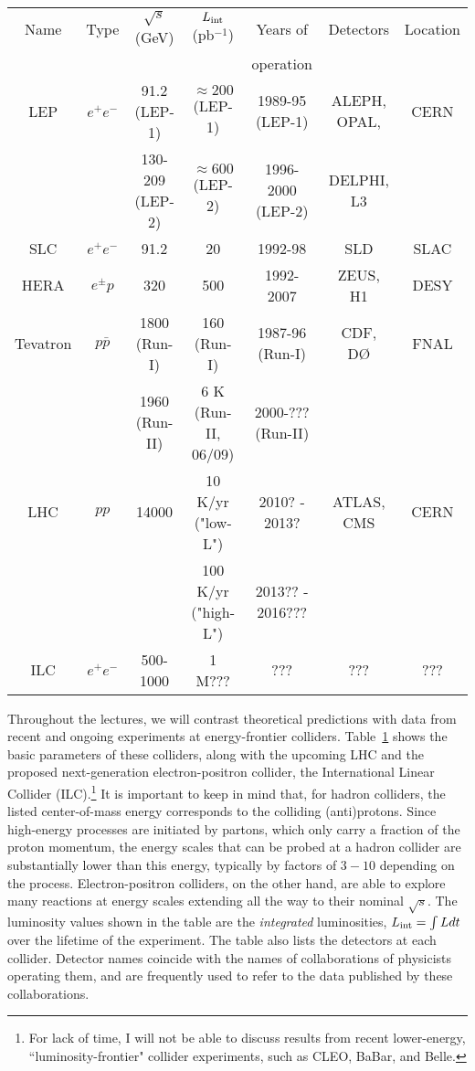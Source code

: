\documentclass{ws-procs9x6}
\begin{document}
\renewcommand{\arraystretch}{1.4}
\begin{table}
{\begin{tabular}{|c|c|c|c|c|c|c|} \hline
  Name & Type & $\sqrt{s}$ (GeV) & $L_{\rm int}$ (pb$^{-1}$) & 
Years of & Detectors  & Location \\
 & & & & operation & & \\ \hline \hline
 LEP & $e^+e^-$ & 91.2 (LEP-1) & $\approx 200$ (LEP-1) & 1989-95 (LEP-1) & ALEPH, OPAL, & CERN \\
      &  & 130-209 (LEP-2) & $\approx 600$ (LEP-2) & 1996-2000 (LEP-2) & DELPHI, L3 & \\
 SLC & $e^+e^-$ & 91.2 & 20 & 1992-98 & SLD & SLAC \\
 HERA & $e^\pm p$ & 320 & 500 & 1992-2007 & ZEUS, H1 & DESY \\
Tevatron & $p\bar{p}$ & 1800 (Run-I) & 160 (Run-I) & 1987-96 (Run-I) & CDF, D{\O} & FNAL \\
& & 1960 (Run-II) & 6 K (Run-II, 06/09) & 2000-??? (Run-II) & & \\
LHC & $pp$ & 14000 & 10 K/yr ("low-L") & 2010? - 2013?&
ATLAS, CMS & CERN \\
& & & 100 K/yr ("high-L") &2013?? - 2016???& & \\ 
ILC & $e^+e^-$ & 500-1000 & 1 M??? & ??? & ??? & ??? \\
 \hline
\end{tabular} }
\label{tab:colliders}
\end{table}
\renewcommand{\arraystretch}{1.0}


Throughout the lectures, we will contrast theoretical predictions with data from recent and ongoing experiments at energy-frontier colliders. Table~\ref{tab:colliders} shows the basic parameters of these colliders, along with the upcoming LHC and the proposed next-generation electron-positron collider, the International Linear Collider (ILC).\footnote{For lack of time, I will not be able to discuss results from recent lower-energy, ``luminosity-frontier" collider experiments, such as CLEO, BaBar, and Belle.} It is important to keep in mind that, for hadron colliders, the listed center-of-mass energy corresponds to the colliding (anti)protons. Since high-energy processes are initiated by partons, which only carry a fraction of the proton momentum, the energy scales that can be probed at a hadron collider are substantially lower than this energy, typically by factors of $3-10$ depending on the process. Electron-positron colliders, on the other hand, are able to explore many reactions at energy scales extending all the way to their nominal $\sqrt{s}$. The luminosity values shown in the table are the {\it integrated} luminosities, $L_{\rm int}=\int L dt$ over the lifetime of the experiment. The table also lists the detectors at each collider. Detector names coincide with the names of collaborations of physicists operating them, and are frequently used to refer to the data published by these collaborations.    
\end{document}
